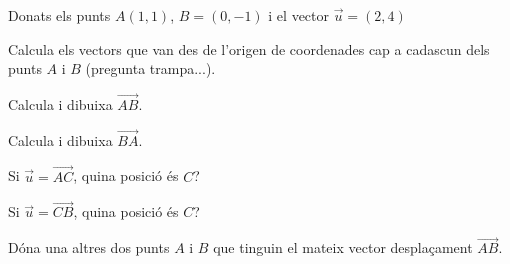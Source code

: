 \Exercise Donats els punts $A(1,1)$, $B=(0,-1)$ i el vector $\vec{u}=(2,4)$
\begin{llista}
  \item Calcula els vectors que van des de l'origen de coordenades cap a cadascun dels punts $A$ i $B$ (pregunta trampa...).
  \item Calcula i dibuixa $\overrightarrow{AB}$.
  \item Calcula i dibuixa $\overrightarrow{BA}$.
  \item Si $\vec{u}=\overrightarrow{AC}$, quina posició és $C$?
  \item Si $\vec{u}=\overrightarrow{CB}$, quina posició és $C$?
  \item Dóna una altres dos punts $A$ i $B$ que tinguin el mateix vector desplaçament $\overrightarrow{AB}$.
\end{llista} 

